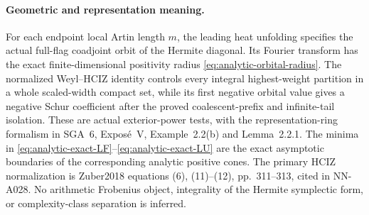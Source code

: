\paragraph{Geometric and representation meaning.}
For each endpoint local Artin length $m$, the leading heat unfolding
specifies the actual full-flag coadjoint orbit of the Hermite diagonal.
Its Fourier transform has the exact finite-dimensional positivity
radius \eqref{eq:analytic-orbital-radius}. The normalized Weyl--HCIZ
identity controls every integral highest-weight partition in a whole
scaled-width compact set, while its first negative orbital value gives
a negative Schur coefficient after the proved coalescent-prefix and
infinite-tail isolation. These are actual exterior-power tests, with
the representation-ring formalism in SGA~6, Expos\'e~V, Example~2.2(b)
and Lemma~2.2.1. The minima in
\eqref{eq:analytic-exact-LF}--\eqref{eq:analytic-exact-LU} are the exact
asymptotic boundaries of the corresponding analytic positive cones.
The primary HCIZ normalization is Zuber2018 equations (6), (11)--(12),
pp.~311--313, cited in NN-A028. No arithmetic Frobenius object,
integrality of the Hermite symplectic form, or complexity-class
separation is inferred.
